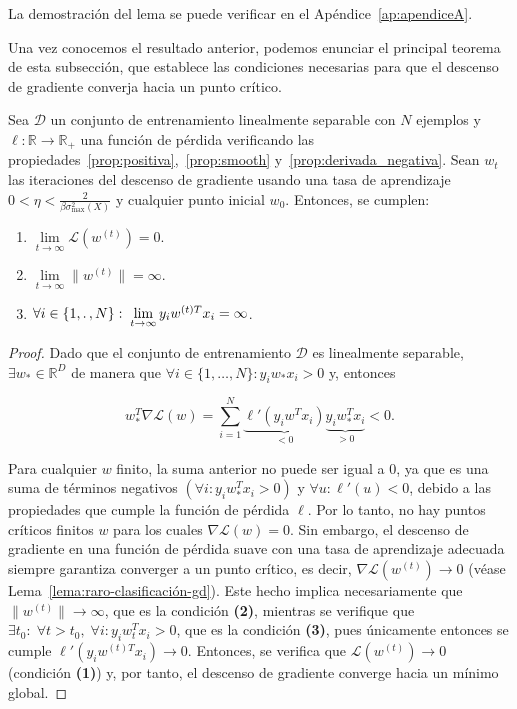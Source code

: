 La demostración del lema se puede verificar en el Apéndice~\ref{ap:apendiceA}.\newline

Una vez conocemos el resultado anterior, podemos enunciar el principal teorema de esta subsección, que establece las condiciones necesarias para que el descenso de gradiente converja hacia un punto crítico.

\begin{teorema}\label{teorema:clasificación-gd}
    Sea $\mathcal{D}$ un conjunto de entrenamiento linealmente separable con $N$ ejemplos y $\ell: \mathbb{R} \to \mathbb{R}_{+}$ una función de pérdida verificando las propiedades~\ref{prop:positiva},~\ref{prop:smooth} y~\ref{prop:derivada_negativa}. Sean $w_t$ las iteraciones del descenso de gradiente usando una tasa de aprendizaje $0 < \eta < \frac{2}{\beta \sigma^{2}_{\max}(X)}$ y cualquier punto inicial $w_0$. Entonces, se cumplen:

    \begin{enumerate}
        \item $\lim \limits_{t \to \infty} \mathcal{L}(w^{(t)}) = 0$.
        \item $\lim \limits_{t \to \infty} \| w^{(t)} \| = \infty$.
        \item $\forall i \in \{ 1, \ldotp, N\}: \; \lim \limits_{t \to \infty} y_i {w}^{(t)T} x_i = \infty$.
    \end{enumerate}
\end{teorema}

\begin{proof}
    Dado que el conjunto de entrenamiento $\mathcal{D}$ es linealmente separable, $\exists w_{*} \in \mathbb{R}^{D}$ de manera que $\forall i \in \{1, \ldots, N \} : y_i w_{*} x_i > 0$ y, entonces

    \[
        w_{*}^{T}\nabla\mathcal{L}(w) = \sum_{i=1}^{N} \underbrace{\ell'(y_i w^{T} x_i)}_{< 0} \underbrace{y_i w_{*}^{T}x_i}_{> 0} < 0.
    \]

    Para cualquier $w$ finito, la suma anterior no puede ser igual a $0$, ya que es una suma de términos negativos $(\forall i: y_i w_{*}^{T}x_i > 0)$ y $\forall u: \ell'(u) < 0$, debido a las propiedades que cumple la función de pérdida $\ell$. Por lo tanto, no hay puntos críticos finitos $w$ para los cuales $\nabla \mathcal{L}(w) = 0$. Sin embargo, el descenso de gradiente en una función de pérdida suave con una tasa de aprendizaje adecuada siempre garantiza converger a un punto crítico, es decir, $\nabla \mathcal{L}(w^{(t)}) \to 0$ (véase Lema~\ref{lema:raro-clasificación-gd}). Este hecho implica necesariamente que $\| w^{(t)} \| \to \infty$, que es la condición \textbf{(2)}, mientras se verifique que $\exists t_0 : \; \forall t > t_0, \; \forall i: y_i w_{t}^{T} x_i > 0$, que es la condición \textbf{(3)}, pues únicamente entonces se cumple $\ell'(y_i {w}^{(t)T} x_i) \to 0$. Entonces, se verifica que $\mathcal{L}(w^{(t)}) \to 0$ (condición \textbf{(1)}) y, por tanto, el descenso de gradiente converge hacia un mínimo global.\newline
\end{proof}

